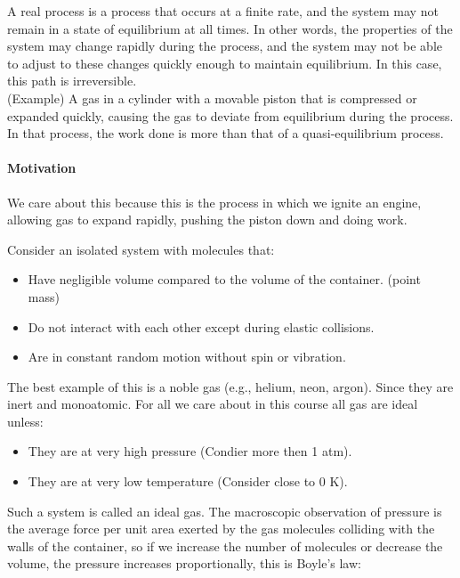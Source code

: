 \documentclass[11pt]{report}
\begin{document}
\begin{definition}
    A real process is a process that occurs at a finite rate, and the system may not remain in a state of equilibrium at all times. In other words, the properties of the system may change rapidly during the process, and the system may not be able to adjust to these changes quickly enough to maintain equilibrium. In this case, this path is irreversible. \\
    (Example) A gas in a cylinder with a movable piston that is compressed or expanded quickly, causing the gas to deviate from equilibrium during the process. In that process, the work done is more than that of a quasi-equilibrium process.
\end{definition}

\begin{shaded}
\paragraph{Motivation} We care about this because this is the process in which we ignite an engine, allowing gas to expand rapidly, pushing the piston down and doing work.
\end{shaded}

\begin{definition}
    Consider an isolated system with molecules that:
    \begin{itemize}
        \item Have negligible volume compared to the volume of the container. (point mass)
        \item Do not interact with each other except during elastic collisions.
        \item Are in constant random motion without spin or vibration.
    \end{itemize}
    The best example of this is a noble gas (e.g., helium, neon, argon). Since they are inert and monoatomic. For all we care about in this course all gas are ideal unless:
    \begin{itemize}
        \item They are at very high pressure (Condier more then 1 atm).
        \item They are at very low temperature (Consider close to 0 K).
    \end{itemize}
\end{definition}

Such a system is called an ideal gas. The macroscopic observation of pressure is the average force per unit area exerted by the gas molecules colliding with the walls of the container, so if we increase the number of molecules or decrease the volume, the pressure increases proportionally, this is Boyle's law:
\end{document}
